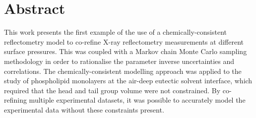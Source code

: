 \section*{Abstract}
This work presents the first example of the use of a chemically-consistent reflectometry model to co-refine X-ray reflectometry measurements at different surface pressures.
This was coupled with a Markov chain Monte Carlo sampling methodology in order to rationalise the parameter inverse uncertainties and correlations.
The chemically-consistent modelling approach was applied to the study of phospholipid monolayers at the air-deep eutectic solvent interface, which required that the head and tail group volume were not constrained.
By co-refining multiple experimental datasets, it was possible to accurately model the experimental data without these constraints present.
